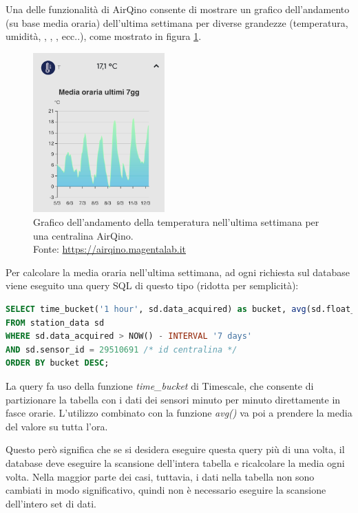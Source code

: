 Una delle funzionalità di AirQino consente di mostrare un grafico dell'andamento (su base media oraria) dell'ultima settimana per diverse grandezze (temperatura, umidità, , , ,  ecc..), come mostrato in figura \ref{fig:airqino-temp}.

\begin{figure}[H]
\centering
\captionsetup{justification=centering}
\includegraphics[width=0.45\textwidth,height=\textheight,keepaspectratio]{img/airqino_temp}
\caption{Grafico dell'andamento della temperatura nell'ultima settimana per una centralina AirQino.\\Fonte: \url{https://airqino.magentalab.it}}
\label{fig:airqino-temp}
\end{figure}

Per calcolare la media oraria nell'ultima settimana, ad ogni richiesta sul database viene eseguito una query SQL di questo tipo (ridotta per semplicità):

\vspace{1mm}
\begin{lstlisting}[language=sql]
SELECT time_bucket('1 hour', sd.data_acquired) as bucket, avg(sd.float_value)
FROM station_data sd
WHERE sd.data_acquired > NOW() - INTERVAL '7 days'
AND sd.sensor_id = 29510691 /* id centralina */
ORDER BY bucket DESC;
\end{lstlisting}

La query fa uso della funzione \textit{time\_bucket} di Timescale, che consente di partizionare la tabella con i dati dei sensori minuto per minuto direttamente in fasce orarie. L'utilizzo combinato con la funzione \textit{avg()} va poi a prendere la media del valore su tutta l'ora.

Questo però significa che se si desidera eseguire questa query più di una volta, il database deve eseguire la scansione dell'intera tabella e ricalcolare la media ogni volta. Nella maggior parte dei casi, tuttavia, i dati nella tabella non sono cambiati in modo significativo, quindi non è necessario eseguire la scansione dell'intero set di dati.

